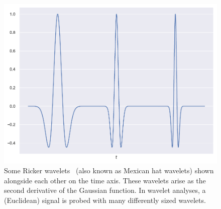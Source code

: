\begin{figure}[htpb]
	\centering\capstart{}
	\includegraphics[width=\textwidth]{ricker_wavelets.pdf}
	\caption[
        A few Ricker wavelets
	]{
        Some Ricker wavelets~\cite{Ricker1953} (also known as Mexican hat wavelets) shown alongside each other on the time axis.
        These wavelets arise as the second derivative of the Gaussian function.
        In wavelet analyses, a (Euclidean) signal is probed with many differently sized wavelets.
	}\label{fig:chapter2_ricker_wavelets}
\end{figure}
